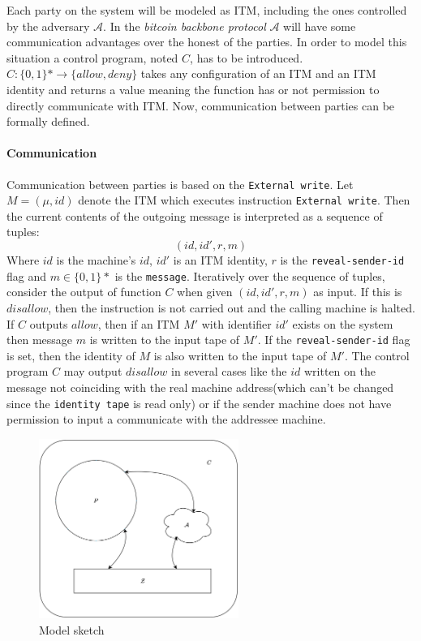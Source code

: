 \documentclass[..]{subfiles}
\begin{document}
Each party on the system will be modeled as ITM, including the ones controlled by the adversary $\mathcal{A}$. In the \textit{bitcoin backbone protocol} $\mathcal{A}$ will have some communication advantages over the honest of the parties. In order to model this situation a control program, noted $C$, has to be introduced. $C:\{0,1\}* \rightarrow \{allow, deny \}$ takes any configuration of an ITM and an ITM identity and returns a value meaning the function has or not permission to directly communicate with ITM. Now, communication between parties can be formally defined.

\paragraph{Communication}
Communication between parties is based on the \texttt{External write}. Let $M = (\mu, id)$ denote the ITM which executes instruction \texttt{External write}. Then the current contents of the outgoing message is interpreted as a sequence of tuples:
$$(id, id', r, m)$$
Where $id$ is the machine's $id$, $id'$ is an ITM identity, $r$ is the \texttt{reveal-sender-id} flag and $m \in \{0, 1\}*$ is the \texttt{message}. Iteratively over the sequence of tuples, consider the output of function $C$ when given $(id, id', r, m)$ as input. If this is $disallow$, then the instruction is not carried out and the calling machine is halted. If $C$ outputs $allow$, then if an ITM $M'$ with identifier $id'$ exists on the system then message $m$ is written to the input tape of $M'$. If the \texttt{reveal-sender-id} flag is set, then the identity of $M$ is also written to the input tape of $M'$. The control program $C$ may output $disallow$ in several cases like the $id$ written on the message not coinciding with the real machine address(which can't be changed since the \texttt{identity tape} is read only) or if the sender machine does not have permission to input a communicate with the addressee machine.

\begin{figure}[H]
	\begin{center}
		\includegraphics[width=0.58\textwidth]{figures/model.png}
	\end{center}
	\caption{Model sketch}
	\label{fig:model_sketch}
\end{figure}
\end{document}

